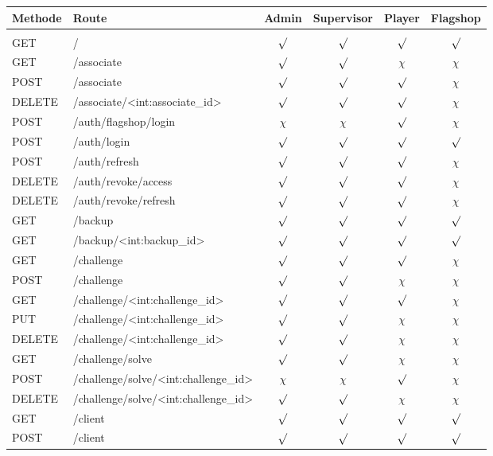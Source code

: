 \begin{table}
	\centering
	\begin{tabular}{l l c c c c}
		Methode & Route	& Admin & Supervisor & Player  & Flagshop \\ [0.5ex]
		\hline &&&&&\\
		GET		& /									& $\surd$ & $\surd$ & $\surd$ & $\surd$ \\
		GET		& /associate 						& $\surd$ & $\surd$ & $\chi$ & $\chi$ \\
		POST	& /associate						& $\surd$ & $\surd$ & $\surd$ & $\chi$ \\
		DELETE	& /associate/<int:associate\_id>	& $\surd$ & $\surd$ & $\surd$ & $\chi$ \\
		POST	& /auth/flagshop/login				& $\chi$ & $\chi$ & $\surd$ & $\chi$ \\
		POST	& /auth/login						& $\surd$ & $\surd$ & $\surd$ & $\surd$ \\
		POST	& /auth/refresh						& $\surd$ & $\surd$ & $\surd$ & $\chi$ \\
		DELETE	& /auth/revoke/access				& $\surd$ & $\surd$ & $\surd$ & $\chi$ \\
		DELETE	& /auth/revoke/refresh				& $\surd$ & $\surd$ & $\surd$ & $\chi$ \\
		GET		& /backup							& $\surd$ & $\surd$ & $\surd$ & $\surd$ \\
		GET 	& /backup/<int:backup\_id>			& $\surd$ & $\surd$ & $\surd$ & $\surd$ \\
		GET		& /challenge						& $\surd$ & $\surd$ & $\surd$ & $\chi$ \\
		POST	& /challenge						& $\surd$ & $\surd$ & $\chi$ & $\chi$ \\
		GET		& /challenge/<int:challenge\_id>	& $\surd$ & $\surd$ & $\surd$ & $\chi$ \\
		PUT		& /challenge/<int:challenge\_id>	& $\surd$ & $\surd$ & $\chi$ & $\chi$ \\
		DELETE	& /challenge/<int:challenge\_id>	& $\surd$ & $\surd$ & $\chi$ & $\chi$ \\
		GET		& /challenge/solve					& $\surd$ & $\surd$ & $\chi$ & $\chi$ \\
		POST	& /challenge/solve/<int:challenge\_id>& $\chi$ & $\chi$ & $\surd$ & $\chi$ \\
		DELETE	& /challenge/solve/<int:challenge\_id>& $\surd$ & $\surd$ & $\chi$ & $\chi$ \\
		GET 	& /client							& $\surd$ & $\surd$ & $\surd$ & $\surd$ \\
		POST	& /client							& $\surd$ & $\surd$ & $\surd$ & $\surd$ \\

\end{tabular}
\end{table}
